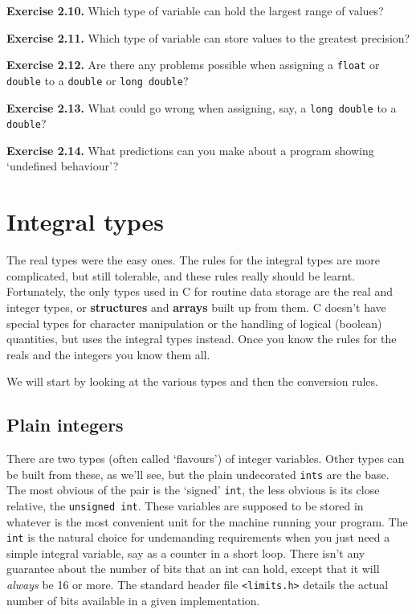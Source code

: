   

  

   \textbf{Exercise 2.10.} Which type of variable can hold the largest range of
    values?


   \textbf{Exercise 2.11.} Which type of variable can store values to the
    greatest precision?


   \textbf{Exercise 2.12.} Are there any problems possible when assigning a
    \texttt{float} or \texttt{double} to a \texttt{double} or
    \texttt{long double}?


   \textbf{Exercise 2.13.} What could go wrong when assigning, say, a \texttt{long
    double} to a \texttt{double}?


   \textbf{Exercise 2.14.} What predictions can you make about a program showing
    `undefined behaviour'?


  

 
        \section{Integral types}
        

  

  The real types were the easy ones. The rules for the integral types are
   more complicated, but still tolerable, and these rules really should be
   learnt. Fortunately, the only types used in C for routine data storage are
   the real and integer types, or \textbf{structures} and \textbf{arrays}
   built up from them. C doesn't have special types for character
   manipulation or the handling of logical (boolean) quantities, but uses the
   integral types instead. Once you know the rules for the reals and the
   integers you know them all.


  We will start by looking at the various types and then the conversion
   rules.


  \subsection{Plain integers}
   

   There are two types (often called `flavours') of integer
    variables. Other types can be built from these, as we'll see, but the
    plain undecorated \texttt{ints} are the base. The most obvious of the
    pair is the `signed' \texttt{int}, the less obvious is its close
    relative, the \texttt{unsigned int}. These variables are supposed to
    be stored in whatever is the most convenient unit for the machine running
    your program. The \texttt{int} is the natural choice for undemanding
    requirements when you just need a simple integral variable, say as a
    counter in a short loop. There isn't any guarantee about the number of
    bits that an int can hold, except that it will \textit{always} be 16 or
    more. The standard header file \texttt{<limits.h>} details the
    actual number of bits available in a given implementation.


